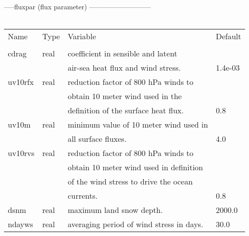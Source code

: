 \\
\\
\\

-----fluxpar  (flux parameter) ---------------------------      \\
\\
\begin{tabular}{llll}
Name	&    Type    &	Variable			      &  Default   \\
\\
\hline
cdrag  &    real     &	coefficient in sensible and latent                  \\
       &	     &	air-sea heat flux and wind stress.    &   1.4e-03   \\    
uv10rfx&    real     & reduction factor of 800 hPa winds to                 \\
       &             & obtain 10 meter wind used in the                     \\
       &             & definition of the surface heat flux.   & 0.8         \\ 
uv10m  &    real     & minimum value of 10 meter wind used in               \\
       &             & all surface fluxes.                    & 4.0         \\  
uv10rvs&    real     & reduction factor of 800 hPa winds to                 \\
       &             & obtain 10 meter wind used in definition              \\
       &             & of the wind stress to drive the ocean                \\
       &             & currents.                              & 0.8         \\       
dsnm   &     real    & maximum land snow depth.               & 2000.0      \\
ndayws &     real    & averaging period of wind stress in days.& 30.0       \\ \hline
\end{tabular}
\\
\\

